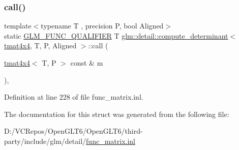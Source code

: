 \subsubsection{\texorpdfstring{call()}{call()}}
{\footnotesize\ttfamily template$<$typename T , precision P, bool Aligned$>$ \\
static \mbox{\hyperlink{setup_8hpp_a33fdea6f91c5f834105f7415e2a64407}{G\+L\+M\+\_\+\+F\+U\+N\+C\+\_\+\+Q\+U\+A\+L\+I\+F\+I\+ER}} T \mbox{\hyperlink{structglm_1_1detail_1_1compute__determinant}{glm\+::detail\+::compute\+\_\+determinant}}$<$ \mbox{\hyperlink{structglm_1_1tmat4x4}{tmat4x4}}, T, P, Aligned $>$\+::call (\begin{DoxyParamCaption}\item[{\mbox{\hyperlink{structglm_1_1tmat4x4}{tmat4x4}}$<$ T, P $>$ const \&}]{m }\end{DoxyParamCaption})\hspace{0.3cm}{\ttfamily [inline]}, {\ttfamily [static]}}



Definition at line 228 of file func\+\_\+matrix.\+inl.



The documentation for this struct was generated from the following file\+:\begin{DoxyCompactItemize}
\item 
D\+:/\+V\+C\+Repos/\+Open\+G\+L\+T6/\+Open\+G\+L\+T6/third-\/party/include/glm/detail/\mbox{\hyperlink{func__matrix_8inl}{func\+\_\+matrix.\+inl}}\end{DoxyCompactItemize}

